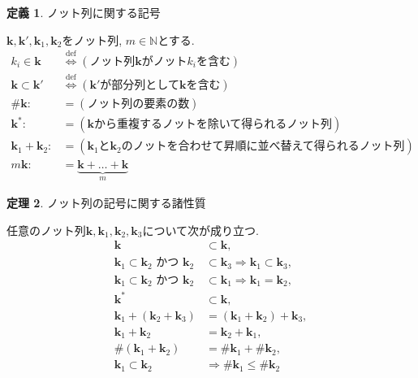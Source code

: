 \documentclass{jsarticle}
\newcommand\subknot[1]{{#1}^*}
\newcommand\Pare[1]{\left(#1\right)}
\newcommand\Def{\overset{\mathrm{def}}{\Longleftrightarrow}}
\theoremstyle{definition}%
\newtheorem{thm}{定理}
\newtheorem{defn}[thm]{定義}
\newtheorem*{rem}{注意}
\newcommand\UC{\textcolor{red}{(執筆中です)}}
\begin{document}
\begin{screen}
	\begin{defn}
		ノット列に関する記号

		$\bm{k}, \bm{k}', \bm{k}_1, \bm{k}_2$をノット列, $m\in\mathbb{N}$とする.
		\begin{align}
			k_{i}\in\bm{k}&\Def(\text{ノット列$\bm{k}$がノット$k_{i}$を含む}) \\
			\bm{k}\subset\bm{k}'&\Def(\text{$\bm{k}'$が部分列として$\bm{k}$を含む}) \\
				\#{\bm{k}}:&=(\text{ノット列の要素の数}) \\
			\subknot{\bm{k}}:&=(\text{$\bm{k}$から重複するノットを除いて得られるノット列}) \\
			\bm{k}_1+\bm{k}_2:&=(\text{$\bm{k}_1$と$\bm{k}_2$のノットを合わせて昇順に並べ替えて得られるノット列}) \\
			m\bm{k}:&=\underbrace{\bm{k}+\dots+\bm{k}}_{m}
		\end{align}
	\end{defn}
\end{screen}


\begin{screen}
	\begin{thm}
		ノット列の記号に関する諸性質

		任意のノット列$\bm{k}, \bm{k}_1, \bm{k}_2, \bm{k}_3$について次が成り立つ.
		\begin{align}
			\bm{k}&\subset\bm{k}, \\
			\bm{k}_1\subset\bm{k}_2 \text{ かつ } \bm{k}_2&\subset\bm{k}_3\Rightarrow \bm{k}_1\subset\bm{k}_3, \\
			\bm{k}_1\subset\bm{k}_2 \text{ かつ } \bm{k}_2&\subset\bm{k}_1\Rightarrow \bm{k}_1=\bm{k}_2, \\
			\subknot{\bm{k}}&\subset\bm{k}, \\
			\bm{k}_1+(\bm{k}_2+\bm{k}_3)&=(\bm{k}_1+\bm{k}_2)+\bm{k}_3, \\
			\bm{k}_1+\bm{k}_2&=\bm{k}_2+\bm{k}_1, \\
			\#\Pare{\bm{k}_1+\bm{k}_2}&=\#{\bm{k}_1}+\#{\bm{k}_2}, \\
			\bm{k}_1\subset\bm{k}_2&\Rightarrow\#{\bm{k}_1}\leq\#{\bm{k}_2}
		\end{align}
	\end{thm}
\end{screen}
%
\end{document}

